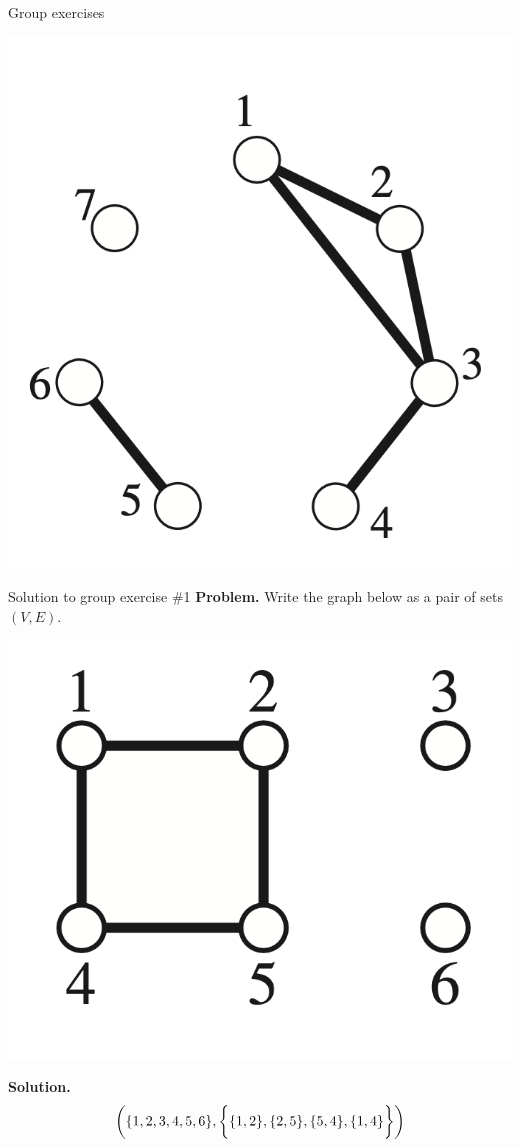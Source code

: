 \documentclass[10pt]{beamer}
\begin{document}
\begin{frame}{Group exercises}
\begin{minipage}[c]{0.38\textwidth}
    \includegraphics[width=\textwidth]{images/simple_graph.png}
\end{minipage}%

\end{frame}




\begin{frame}{Solution to group exercise \#1}
\small 
\textbf{Problem.} Write the graph below as a pair of sets $(V, E)$.
\vfill 
\begin{center}
    \includegraphics[width=.5\textwidth]{images/simple_graph_2} %
\end{center}   

\vfill 

\textbf{Solution.}
\[ \bigg( \{ {1,2,3,4,5,6} \}, \bigg\{ \{ {1,2} \}, \{ {2,5} \}, \{ {5,4} \}, \{ {1,4} \} \bigg\} \bigg) \]
    
\end{frame}
\end{document}
